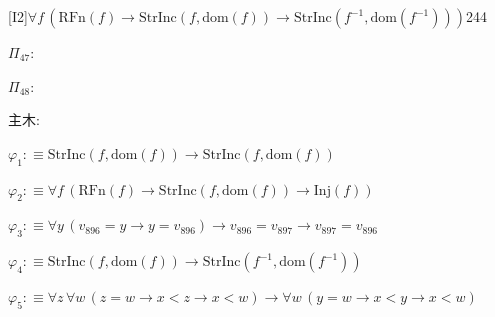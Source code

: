 \begin{fullproof}{[I2]}{$\forall f\,(\mathrm{RFn}(f) \to \mathrm{StrInc}(f,\mathrm{dom}(f)) \to \mathrm{StrInc}(f^{-1},\mathrm{dom}(f^{-1})))$}{244}
\begin{ptree}
\end{ptree}
\noindent$\Pi_{47}$:
\begin{ptree}
\noLine
{}
\end{ptree}
\noindent$\Pi_{48}$:
\begin{ptree}
\noLine
{}
\end{ptree}
\noindent 主木:
\begin{ptree}
\noLine
{}
\end{ptree}
\begin{abbrevlist}
\item $\varphi_{1} :\equiv \mathrm{StrInc}(f,\mathrm{dom}(f)) \to \mathrm{StrInc}(f,\mathrm{dom}(f))$
\item $\varphi_{2} :\equiv \forall f\,(\mathrm{RFn}(f) \to \mathrm{StrInc}(f,\mathrm{dom}(f)) \to \mathrm{Inj}(f))$
\item $\varphi_{3} :\equiv \forall y\,(v_{896} = y \to y = v_{896}) \to v_{896} = v_{897} \to v_{897} = v_{896}$
\item $\varphi_{4} :\equiv \mathrm{StrInc}(f,\mathrm{dom}(f)) \to \mathrm{StrInc}(f^{-1},\mathrm{dom}(f^{-1}))$
\item $\varphi_{5} :\equiv \forall z\,\forall w\,(z = w \to x < z \to x < w) \to \forall w\,(y = w \to x < y \to x < w)$

\end{abbrevlist}
\end{fullproof}
